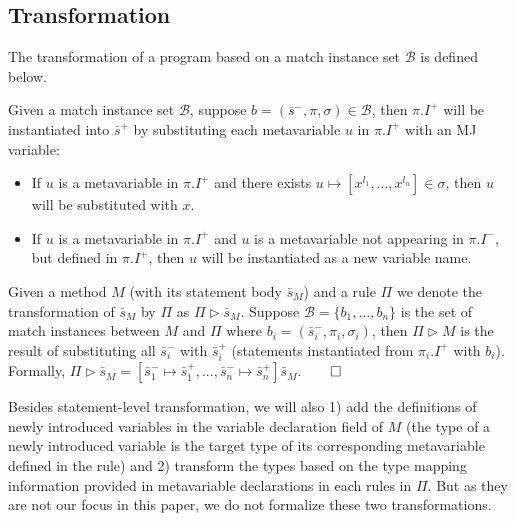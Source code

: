 \documentclass[a4paper, USenglish]{lipics-v2016}
\theoremstyle{plain}
\begin{document}
\subsection{Transformation} 
The transformation of a program based on a match instance set $\mathcal{B}$ is defined below.


\begin{definition}
\label{def:pattern_instantiation}
Given a match instance set $\mathcal{B}$, suppose
$b=(\bar{s}^-,\pi,\sigma)\in \mathcal{B}$, then $\pi.I^+$ will be
instantiated into $\bar{s}^+$ by substituting each metavariable $u$ in $\pi.I^+$ with an MJ variable:
\begin{itemize}
\item If $u$ is a metavariable in $\pi.I^+$ and there exists $u\mapsto[x^{l_1},...,x^{l_n}]\in \sigma$, then $u$ will be substituted with $x$.
\item If $u$ is a metavariable in $\pi.I^+$ and $u$ is a metavariable not appearing in $\pi.I^-$, but defined in $\pi.I^+$, then $u$ will be instantiated as a new variable name.
\end{itemize}
\end{definition}

\begin{definition} Given a method $M$
  (with its statement body $\bar{s}_M$) and a rule $\Pi$ we denote the
  transformation of $\bar{s}_M$ by $\Pi$ as $\Pi\triangleright
  \bar{s}_M$. Suppose $\mathcal{B}=\{b_1,...,b_n\}$ is the set of
  match instances between $M$ and $\Pi$ where
  $b_i=(\bar{s}^-_i,\pi_i,\sigma_i)$, then $\Pi\triangleright M$ is
  the result of substituting all $\bar{s}_i^-$ with $\bar{s}_i^+$ (statements instantiated from $\pi_i.I^+$ with $b_i$). Formally, $\Pi\triangleright \bar{s}_M=[\bar{s}_1^-\mapsto \bar{s}_1^+,...,\bar{s}_n^{-}\mapsto\bar{s}_n^+]\bar{s}_M$.\hfill $\qed$
\end{definition}

Besides statement-level transformation, we will also 1) add the definitions of newly introduced variables in the variable declaration field of $M$ (the type of a newly introduced variable is the target type of its corresponding metavariable defined in the rule) and 2) transform the types based on the type mapping information provided in metavariable declarations in each rules in $\Pi$. But as they are not our focus in this paper, we do not formalize these two transformations.
\end{document}
